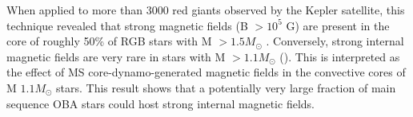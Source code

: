 When applied to more than 3000 red giants observed by the Kepler satellite, this technique revealed that
strong magnetic fields (B $> 10^5$ G) are present in the core of roughly 50\% of RGB stars with M $> 1.5M_\odot$ \citep{Stello_2016}.
Conversely, strong internal magnetic fields are very rare in stars with M $> 1.1M_\odot$ (\color). This is interpreted as the
effect of MS core-dynamo-generated magnetic fields in the convective cores of M $ 1.1M_\odot$ stars.
This result shows that a potentially very large fraction of main sequence OBA stars could host strong internal magnetic fields.



